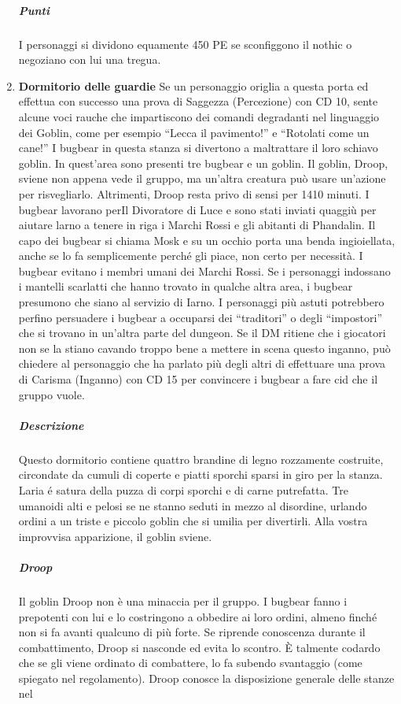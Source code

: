 \documentclass{article}
\begin{document}
\begin{enumerate}
\subparagraph{Punti}I personaggi si dividono equamente 450 PE se sconfiggono il
nothic o negoziano con lui una tregua.
\item \textbf{Dormitorio delle guardie} Se un personaggio origlia a questa porta ed effettua con
successo una prova di Saggezza (Percezione) con CD 10,
sente alcune voci rauche che impartiscono dei comandi
degradanti nel linguaggio dei Goblin, come per esempio
“Lecca il pavimento!” e “Rotolati come un cane!” I bugbear in
questa stanza si divertono a maltrattare il loro schiavo goblin.
In quest'area sono presenti tre bugbear e un goblin. Il
goblin, Droop, sviene non appena vede il gruppo, ma un’altra
creatura può usare un’azione per risvegliarlo. Altrimenti,
Droop resta privo di sensi per 1410 minuti.
I bugbear lavorano perIl Divoratore di Luce e sono stati inviati
quaggiù per aiutare larno a tenere in riga i Marchi Rossi e
gli abitanti di Phandalin. Il capo dei bugbear si chiama Mosk
e su un occhio porta una benda ingioiellata, anche se lo fa
semplicemente perché gli piace, non certo per necessità.
I bugbear evitano i membri umani dei Marchi Rossi. Se i
personaggi indossano i mantelli scarlatti che hanno trovato
in qualche altra area, i bugbear presumono che siano al
servizio di Iarno. I personaggi più astuti potrebbero perfino
persuadere i bugbear a occuparsi dei “traditori” o degli
“impostori” che si trovano in un’altra parte del dungeon. Se
il DM ritiene che i giocatori non se la stiano cavando troppo
bene a mettere in scena questo inganno, può chiedere al
personaggio che ha parlato più degli altri di effettuare una
prova di Carisma (Inganno) con CD 15 per convincere i
bugbear a fare cid che il gruppo vuole.
\subparagraph{Descrizione} Questo dormitorio contiene quattro brandine di legno
rozzamente costruite, circondate da cumuli di coperte e
piatti sporchi sparsi in giro per la stanza. Laria é satura della
puzza di corpi sporchi e di carne putrefatta. Tre umanoidi alti
e pelosi se ne stanno seduti in mezzo al disordine, urlando
ordini a un triste e piccolo goblin che si umilia per divertirli.
Alla vostra improvvisa apparizione, il goblin sviene.
\subparagraph{Droop} Il goblin Droop non è una minaccia per il gruppo. I bugbear
fanno i prepotenti con lui e lo costringono a obbedire ai loro
ordini, almeno finché non si fa avanti qualcuno di più forte.
Se riprende conoscenza durante il combattimento, Droop
si nasconde ed evita lo scontro. È talmente codardo che se gli
viene ordinato di combattere, lo fa subendo svantaggio (come
spiegato nel regolamento).
Droop conosce la disposizione generale delle stanze nel

\end{enumerate}
\end{document}
